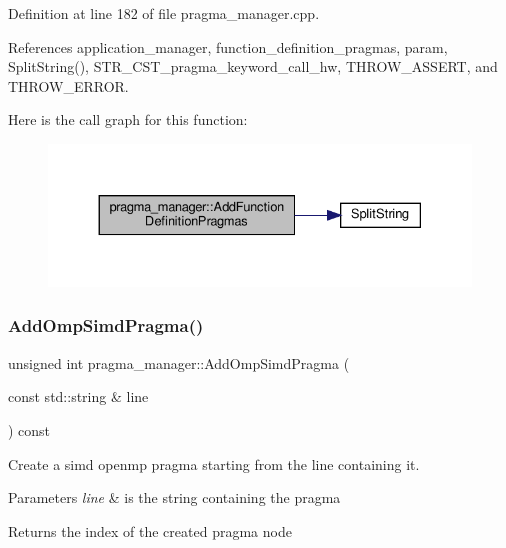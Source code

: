 Definition at line 182 of file pragma\+\_\+manager.\+cpp.



References application\+\_\+manager, function\+\_\+definition\+\_\+pragmas, param, Split\+String(), S\+T\+R\+\_\+\+C\+S\+T\+\_\+pragma\+\_\+keyword\+\_\+call\+\_\+hw, T\+H\+R\+O\+W\+\_\+\+A\+S\+S\+E\+RT, and T\+H\+R\+O\+W\+\_\+\+E\+R\+R\+OR.

Here is the call graph for this function\+:
\nopagebreak
\begin{figure}[H]
\begin{center}
\leavevmode
\includegraphics[width=330pt]{d2/d1d/classpragma__manager_a8ae9fe4e390d2823fc713a6a4219edf0_cgraph}
\end{center}
\end{figure}
\mbox{\label{classpragma__manager_ad0fd54d0ee85c926008a7c0ed76dfaa3}} 
\subsubsection{\texorpdfstring{Add\+Omp\+Simd\+Pragma()}{AddOmpSimdPragma()}}
{\footnotesize\ttfamily unsigned int pragma\+\_\+manager\+::\+Add\+Omp\+Simd\+Pragma (\begin{DoxyParamCaption}\item[{const std\+::string \&}]{line }\end{DoxyParamCaption}) const}



Create a simd openmp pragma starting from the line containing it. 


\begin{DoxyParams}{Parameters}
{\em line} & is the string containing the pragma \\
\hline
\end{DoxyParams}
\begin{DoxyReturn}{Returns}
the index of the created pragma node 
\end{DoxyReturn}


